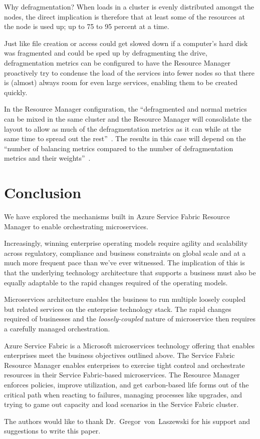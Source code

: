 Why defragmentation? When loads in a cluster is evenly distributed
amongst the nodes, the direct implication is therefore that at least
some of the resources at the node is used up; up to 75 to 95 percent
at a time.

Just like file creation or access could get slowed down if a
computer's hard disk was fragmented and could be sped up by
defragmenting the drive, defragmentation metrics can be configured to
have the Resource Manager proactively try to condense the load of the
services into fewer nodes so that there is (almost) always room for
even large services, enabling them to be created quickly.

In the Resource Manager configuration, the ``defragmented and normal
metrics can be mixed in the same cluster and the Resource Manager will
consolidate the layout to allow as much of the
defragmentation metrics as it can while at the same time to spread out the
rest''~\cite{hid-sp18-501-defrag}. The results in this case will depend 
on the ``number of balancing
metrics compared to the number of defragmentation metrics and their
weights''~\cite{hid-sp18-501-description}.


\section{Conclusion}
We have explored the mechanisms built in Azure Service Fabric 
Resource Manager to enable orchestrating 
microservices.

Increasingly, winning enterprise operating models require agility and
scalability across regulatory, compliance and business constraints on
global scale and at a much more frequent pace than we’ve ever
witnessed. The implication of this is that the underlying technology
architecture that supports a business must also be equally adaptable
to the rapid changes required of the operating models.

Microservices architecture enables the business to run multiple
loosely coupled but related services on the enterprise technology
stack. The rapid changes required of businesses and the
\textit{loosely-coupled} nature of microservice then requires a carefully
managed orchestration.

Azure Service Fabric is a Microsoft microservices technology offering
that enables enterprises meet the business objectives outlined
above. The Service Fabric Resource Manager enables enterprises to
exercise tight control and orchestrate resources in their Service
Fabric-based microservices. The Resource Manager enforces policies,
improve utilization, and get carbon-based life forms out of the
critical path when reacting to failures, managing processes like
upgrades, and trying to game out capacity and load scenarios in the
Service Fabric cluster.


\begin{acks}

  The authors would like to thank Dr.~Gregor~von~Laszewski for his
  support and suggestions to write this paper.

\end{acks}



